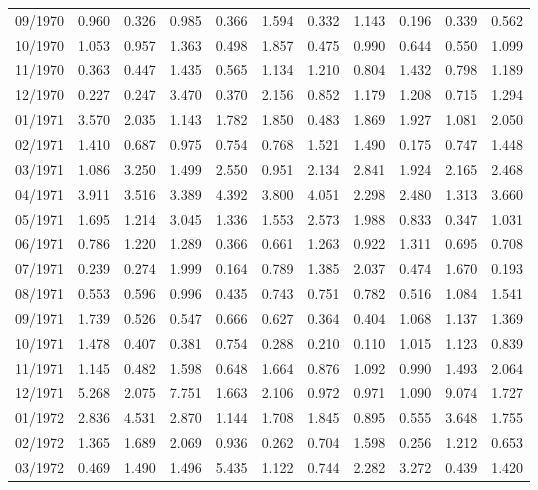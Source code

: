 \begin{tabular}{lrrrrrrrrrr}
09/1970 &  0.960 &  0.326 &  0.985 &  0.366 &  1.594 &  0.332 &  1.143 &  0.196 &  0.339 &  0.562 \\
10/1970 &  1.053 &  0.957 &  1.363 &  0.498 &  1.857 &  0.475 &  0.990 &  0.644 &  0.550 &  1.099 \\
11/1970 &  0.363 &  0.447 &  1.435 &  0.565 &  1.134 &  1.210 &  0.804 &  1.432 &  0.798 &  1.189 \\
12/1970 &  0.227 &  0.247 &  3.470 &  0.370 &  2.156 &  0.852 &  1.179 &  1.208 &  0.715 &  1.294 \\
01/1971 &  3.570 &  2.035 &  1.143 &  1.782 &  1.850 &  0.483 &  1.869 &  1.927 &  1.081 &  2.050 \\
02/1971 &  1.410 &  0.687 &  0.975 &  0.754 &  0.768 &  1.521 &  1.490 &  0.175 &  0.747 &  1.448 \\
03/1971 &  1.086 &  3.250 &  1.499 &  2.550 &  0.951 &  2.134 &  2.841 &  1.924 &  2.165 &  2.468 \\
04/1971 &  3.911 &  3.516 &  3.389 &  4.392 &  3.800 &  4.051 &  2.298 &  2.480 &  1.313 &  3.660 \\
05/1971 &  1.695 &  1.214 &  3.045 &  1.336 &  1.553 &  2.573 &  1.988 &  0.833 &  0.347 &  1.031 \\
06/1971 &  0.786 &  1.220 &  1.289 &  0.366 &  0.661 &  1.263 &  0.922 &  1.311 &  0.695 &  0.708 \\
07/1971 &  0.239 &  0.274 &  1.999 &  0.164 &  0.789 &  1.385 &  2.037 &  0.474 &  1.670 &  0.193 \\
08/1971 &  0.553 &  0.596 &  0.996 &  0.435 &  0.743 &  0.751 &  0.782 &  0.516 &  1.084 &  1.541 \\
09/1971 &  1.739 &  0.526 &  0.547 &  0.666 &  0.627 &  0.364 &  0.404 &  1.068 &  1.137 &  1.369 \\
10/1971 &  1.478 &  0.407 &  0.381 &  0.754 &  0.288 &  0.210 &  0.110 &  1.015 &  1.123 &  0.839 \\
11/1971 &  1.145 &  0.482 &  1.598 &  0.648 &  1.664 &  0.876 &  1.092 &  0.990 &  1.493 &  2.064 \\
12/1971 &  5.268 &  2.075 &  7.751 &  1.663 &  2.106 &  0.972 &  0.971 &  1.090 &  9.074 &  1.727 \\
01/1972 &  2.836 &  4.531 &  2.870 &  1.144 &  1.708 &  1.845 &  0.895 &  0.555 &  3.648 &  1.755 \\
02/1972 &  1.365 &  1.689 &  2.069 &  0.936 &  0.262 &  0.704 &  1.598 &  0.256 &  1.212 &  0.653 \\
03/1972 &  0.469 &  1.490 &  1.496 &  5.435 &  1.122 &  0.744 &  2.282 &  3.272 &  0.439 &  1.420 \\

\end{tabular}

